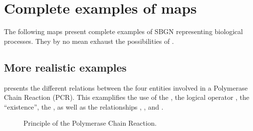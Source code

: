 \chapter{Complete examples of \SBGNERLone maps}

The following maps present complete examples of SBGN \ERs representing biological processes. They by no mean exhaust the possibilities of \SBGNERLone.\\



\section{More realistic examples}
 presents the different relations between the four entities involved in a Polymerase Chain Reaction (PCR). This examplifies the use of the , the logical operator , the  ``existence'', the , as well as the relationships , ,  and .

\begin{figure}[htb]
\begin{center}
\caption{Principle of the Polymerase Chain Reaction.}\label{fig:PCR}
\end{center}
\end{figure}

